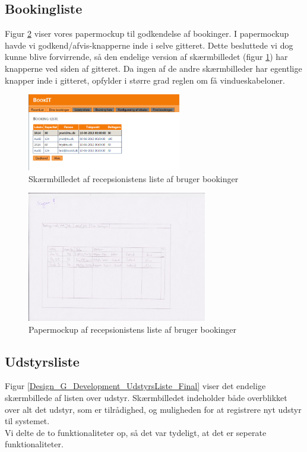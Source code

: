 \subsection{Bookingliste}
Figur \ref{Design_G_Development_BookingListe} viser vores papermockup til godkendelse af bookinger. 
I papermockup havde vi godkend/afvis-knapperne inde i selve gitteret. Dette besluttede vi dog kunne blive forvirrende, så den endelige version af skærmbilledet (figur \ref{Design_G_Development_BookingListe_Final}) har knapperne ved siden af gitteret. Da ingen af de andre skærmbilleder har egentlige knapper inde i gitteret, opfylder i større grad reglen om få vindueskabeloner.

\begin{figure}[h!]
  \centering
    \includegraphics[width=0.6\textwidth]{Appendix/GUI-Prototype/DigitalMockup/BookingListe}
  \caption{Skærmbilledet af recepsionistens liste af bruger bookinger}
\label{Design_G_Development_BookingListe_Final}
\end{figure} 

\begin{figure}[h!]
  \centering
    \includegraphics[width=0.7\textwidth]{Appendix/GUI-Prototype/PaperMockup/GodkendBookinger_001}
  \caption{Papermockup af recepsionistens liste af bruger bookinger}
\label{Design_G_Development_BookingListe}
\end{figure} 

\subsection{Udstyrsliste}
Figur \ref{Design_G_Development_UdstyrsListe_Final} viser det endelige skærmbillede af listen over udstyr.
Skærmbilledet indeholder både overblikket over alt det udstyr, som er tilrådighed, og muligheden for at registrere nyt udstyr til systemet.
\\Vi delte de to funktionaliteter op, så det var tydeligt, at det er seperate funktionaliteter.

